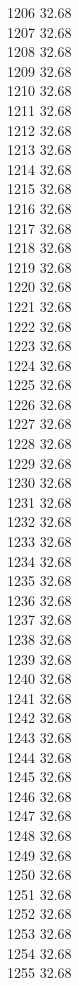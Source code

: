 1206	32.68\\
1207	32.68\\
1208	32.68\\
1209	32.68\\
1210	32.68\\
1211	32.68\\
1212	32.68\\
1213	32.68\\
1214	32.68\\
1215	32.68\\
1216	32.68\\
1217	32.68\\
1218	32.68\\
1219	32.68\\
1220	32.68\\
1221	32.68\\
1222	32.68\\
1223	32.68\\
1224	32.68\\
1225	32.68\\
1226	32.68\\
1227	32.68\\
1228	32.68\\
1229	32.68\\
1230	32.68\\
1231	32.68\\
1232	32.68\\
1233	32.68\\
1234	32.68\\
1235	32.68\\
1236	32.68\\
1237	32.68\\
1238	32.68\\
1239	32.68\\
1240	32.68\\
1241	32.68\\
1242	32.68\\
1243	32.68\\
1244	32.68\\
1245	32.68\\
1246	32.68\\
1247	32.68\\
1248	32.68\\
1249	32.68\\
1250	32.68\\
1251	32.68\\
1252	32.68\\
1253	32.68\\
1254	32.68\\
1255	32.68\\
